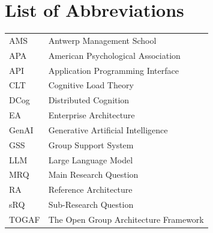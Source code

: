 \listoffigures
{}
\clearpage

\listoftables
{}
\clearpage

\section*{List of Abbreviations}

\begin{longtable}{@{} l l @{}}
AMS   & Antwerp Management School \\
APA   & American Psychological Association \\
API   & Application Programming Interface \\
CLT   & Cognitive Load Theory \\
DCog  & Distributed Cognition \\
EA    & Enterprise Architecture \\
GenAI & Generative Artificial Intelligence \\
GSS   & Group Support System \\
LLM   & Large Language Model \\
MRQ   & Main Research Question \\
RA    & Reference Architecture \\
sRQ   & Sub-Research Question \\
TOGAF & The Open Group Architecture Framework \\
\end{longtable}
\clearpage

\newpage\thispagestyle{empty}\mbox{}\newpage
